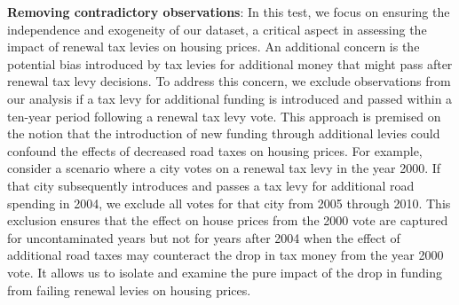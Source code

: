 \vskip 0.5cm

\textbf{Removing contradictory observations}: In this test, we focus on ensuring the independence and exogeneity of our dataset, a critical aspect in assessing the impact of renewal tax levies on housing prices. An additional concern is the potential bias introduced by tax levies for additional money that might pass after renewal tax levy decisions.
To address this concern, we exclude observations from our analysis if a tax levy for additional funding is introduced and passed within a ten-year period following a renewal tax levy vote. This approach is premised on the notion that the introduction of new funding through additional levies could confound the effects of decreased road taxes on housing prices. 
For example, consider a scenario where a city votes on a renewal tax levy in the year 2000. If that city subsequently introduces and passes a tax levy for additional road spending in 2004, we exclude all votes for that city from 2005 through 2010. This exclusion ensures that the effect on house prices from the 2000 vote are captured for uncontaminated years but not for years after 2004 when the effect of additional road taxes may counteract the drop in tax money from the year 2000 vote. It allows us to isolate and examine the pure impact of the drop in funding from failing renewal levies on housing prices. 

